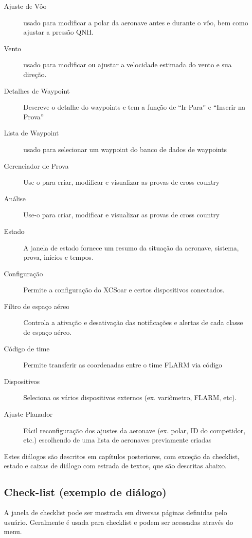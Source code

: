 \begin{description}
\item[Ajuste de Vôo] usado para modificar a polar da aeronave antes e durante o vôo, bem como ajustar a pressão QNH.
\item[Vento] usado para modificar ou ajustar a velocidade estimada do vento e sua direção. 
\item[Detalhes de Waypoint] Descreve o detalhe do waypoints e tem a função de “Ir Para” e “Inserir na Prova”
\item[Lista de Waypoint] usado para selecionar um waypoint do banco de dados de waypoints
\item[Gerenciador de Prova]Use-o para criar, modificar e visualizar as provas de cross country
\item[Análise] Use-o para criar, modificar e visualizar as provas de cross country
\item[Estado] A janela de estado fornece um resumo da situação da aeronave, sistema, prova, inícios e tempos.
\item[Configuração] Permite a configuração do XCSoar e certos dispositivos conectados.
\item[Filtro de espaço aéreo] Controla a ativação e desativação das notificações e alertas de cada classe de espaço aéreo.
\item[Código de time] Permite transferir as coordenadas entre o time FLARM via código
\item[Dispositivos]  Seleciona os vários dispositivos externos (ex. variômetro, FLARM, etc).
\item[Ajuste Planador]  Fácil reconfiguração dos ajustes da aeronave (ex. polar, ID do competidor, etc.) escolhendo de uma lista de aeronaves previamente criadas
\end{description}

Estes diálogos são descritos em capítulos posteriores, com exceção da checklist, estado e caixas de diálogo com estrada de textos, que são descritas abaixo.


\subsection*{Check-list (exemplo de diálogo)}\label{sec:checklist}

A janela de checklist pode ser mostrada em diversas páginas definidas pelo usuário.  Geralmente é usada para checklist e podem ser acessadas através do menu.

\blink{}

